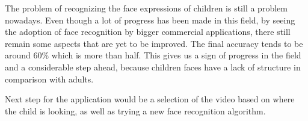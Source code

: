 \documentclass[runningheads,a4paper,11pt]{report}
\begin{document}
The problem of recognizing the face expressions of children is still a problem nowadays. Even though a lot of progress has been made in this field, by seeing the adoption of face recognition by bigger commercial applications, there still remain some aspects that are yet to be improved. The final accuracy tends to be around 60\% which is more than half. This gives us a sign of progress in the field and a considerable step ahead, because children faces have a lack of structure in comparison with adults. 

Next step for the application would be a selection of the video based on where the child is looking, as well as trying a new face recognition algorithm.

\printglossaries



\end{document}
